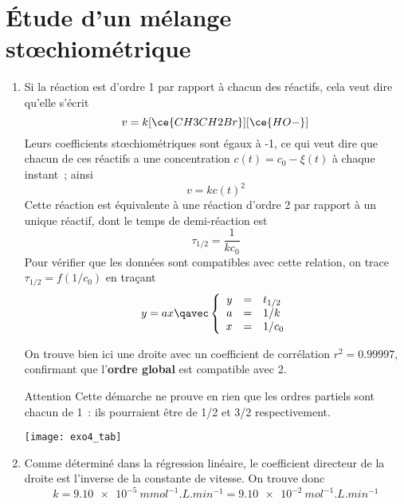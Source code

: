 \documentclass[a4paper, 12pt, final, garamond]{book}
\begin{document}
\section{Étude d'un mélange stœchiométrique}
\begin{enumerate}
    \item Si la réaction est d'ordre 1 par rapport à chacun des réactifs, cela
        veut dire qu'elle s'écrit
        \[v = k [\ce{CH3CH2Br}][\ce{HO-}]\]
        Leurs coefficients stœchiométriques sont égaux à -1, ce qui veut dire
        que chacun de ces réactifs a une concentration $c(t) = c_0 - \xi(t)$ à
        chaque instant~; ainsi
        \[v = k c(t)^2\]
        Cette réaction est équivalente à une réaction d'ordre 2 par rapport à un
        unique réactif, dont le temps de demi-réaction est
        \[\tau_{1/2} = \frac{1}{kc_0}\]
        Pour vérifier que les données sont compatibles avec cette relation, on
        trace $\tau_{1/2} = f(1/c_0)$ en traçant
        \[y = ax
            \qavec
            \left\{
                \begin{array}{rcl}
                    y & = & t_{1/2}\\
                    a & = & 1/k\\
                    x & = & 1/c_0
                \end{array}
            \right.
        \]
        \begin{minipage}{0.45\linewidth}
            On trouve bien ici une droite avec un coefficient de corrélation
            $r^2 = \num{0.99997}$, confirmant que l'\textbf{ordre global} est
            compatible avec 2.
            \begin{rror}{Attention}
                Cette démarche ne prouve en rien que les ordres partiels sont
                chacun de 1~: ils pourraient être de 1/2 et 3/2 respectivement.
            \end{rror}
        \end{minipage}
        \hfill
        \begin{minipage}{0.55\linewidth}
            \begin{center}
                \texttt{[image: exo4\_tab]}
            \end{center}
        \end{minipage}
    \item Comme déterminé dans la régression linéaire, le coefficient directeur
        de la droite est l'inverse de la constante de vitesse. On trouve donc
        \[\boxed{k = \SI{9.10e-5}{mmol^{-1}.L.min^{-1}} =
        \SI{9.10e-2}{mol^{-1}.L.min^{-1}}}\]
\end{enumerate}
\end{document}

